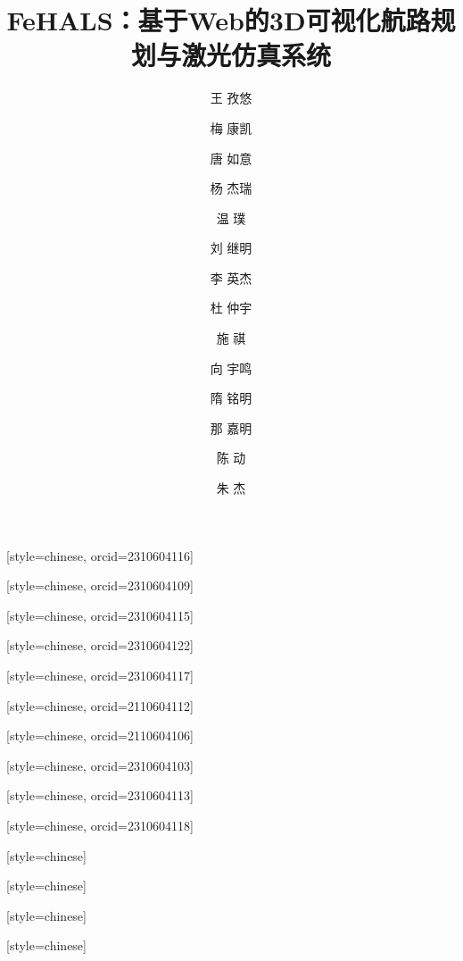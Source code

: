 \documentclass[a4paper,fleqn]{cas-sc}
\begin{document}
\let\WriteBookmarks\relax
\def\floatpagepagefraction{1}
\def\textpagefraction{.001}

\shorttitle{}
\title [mode = title]{FeHALS：基于Web的3D可视化航路规划与激光仿真系统}




\author[1]{王 孜悠}[style=chinese, orcid=2310604116]

\author[1]{梅 康凯}[style=chinese, orcid=2310604109]

\author[1]{唐 如意}[style=chinese, orcid=2310604115]

\author[1]{杨 杰瑞}[style=chinese, orcid=2310604122]

\author[1]{温 璞}[style=chinese, orcid=2310604117]

\author[1]{刘 继明}[style=chinese, orcid=2110604112]

\author[1]{李 英杰}[style=chinese, orcid=2110604106]

\author[1]{杜 仲宇}[style=chinese, orcid=2310604103]

\author[1]{施 祺}[style=chinese, orcid=2310604113]

\author[1]{向 宇鸣}[style=chinese, orcid=2310604118]

\author[1]{隋 铭明}[style=chinese]
\fnmark[1]

\author[1]{那 嘉明}[style=chinese]
\fnmark[1]

\author[1]{陈 动}[style=chinese]
\fnmark[1]

\author[1]{朱 杰}[style=chinese]
\fnmark[1]

\end{document}
